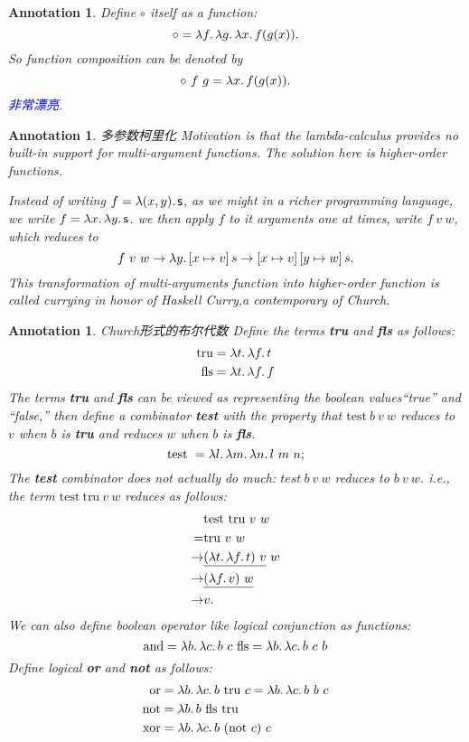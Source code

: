 \documentclass{article}
\theoremstyle{plain}
\newtheorem{annotation}[theorem]{Annotation}
\theoremstyle{nonumberplain}
\newcommand{\lam}[2]{\ensuremath{\lambda #1\ldotp #2}} %
\newcommand{\term}[1]{\ensuremath\mathsf{#1}}
\newcommand{\bluet}[1]{\textcolor{blue}{#1}}
\begin{document}
\begin{annotation}
\rm Define $\circ$ itself as a function:
$$
\circ = \lam{f}{\lam{g}{\lam{x}{f(g(x))}}}. 
$$
So function composition can be denoted by
$$
\circ~f~g  = \lam{x}{f(g(x))}.
$$
\bluet{非常漂亮}. 
\end{annotation}

\begin{annotation}
\rm {\color{red} 多参数柯里化} Motivation is that the lambda-calculus provides no built-in support for multi-argument functions. The solution here is higher-order functions. 

Instead of writing $f = \lam{(x,y)}{\term{s}}$, as we might in a richer programming language, we write $f = \lam{x}{\lam{y}{\term{s}}}$. we then apply $f$ to it arguments one at times, write $f~v~w$, which reduces to
$$
f~v~w \rightarrow \lam{y}{\left[ x \mapsto v \right] s} \rightarrow \left[ x \mapsto v \right]\left[ y \mapsto w \right]s.
$$
This transformation of multi-arguments function into higher-order function is called {\color{red} currying} in honor of Haskell Curry,a contemporary of Church.
\end{annotation}

\begin{annotation}
\rm {\color{red} Church形式的布尔代数} Define the terms \textbf{tru} and \textbf{fls} as follows:
$$
\begin{aligned}
\text{tru} &= \lam{t}{\lam{f}{t}}\\
\text{fls} &= \lam{t}{\lam{f}{f}}\\
\end{aligned}
$$
The terms \textbf{tru} and \textbf{fls} can be viewed as representing the boolean values“true” and “false,” then define a combinator \textbf{test} with the property that $\text{test}~b~v~w$ reduces to $v$ when $b$ is \textbf{tru} and reduces $w$ when $b$ is \textbf{fls}.
$$
\text{test}~= \lam{l}{\lam{m}{\lam{n}{l~m~n}}};
$$  
The \textbf{test} combinator does not actually do much: $test~b~v~w$ reduces to $b~v~w$. i.e., the term $\text{test}~\text{tru}~v~w$ reduces as follows:
$$
\begin{aligned}
&\text{test}~\text{tru}~v~w \\
= & \text{tru}~v~w \\
\rightarrow & \underline{(\lam{t}{\lam{f}{t}})~v}~w \\
\rightarrow & \underline{(\lam{f}{v})~w} \\
\rightarrow & v.
\end{aligned}
$$
We can also define boolean operator like logical conjunction as functions:
$$
\text{and} = \lam{b}{\lam{c}{b~c~\text{fls}}} = \lam{b}{\lam{c}{b~c~b}} 
$$
Define logical \textbf{or} and \textbf{not} as follows:
$$
\begin{aligned}
\text{or} &= \lam{b}{\lam{c}{b~\text{tru}~c}} = \lam{b}{\lam{c}{b~b~c}} \\
\text{not} &= \lam{b}{b~\text{fls}~\text{tru}} \\
\text{xor} &= \lam{b}{\lam{c}{b~(\text{not}~c)~c}}
\end{aligned}
$$ 
\end{annotation}
\end{document}
